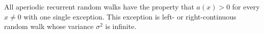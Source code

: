 All aperiodic recurrent random walks have the property that \(a(x) > 0\) for every \(x \neq 0\) with one single exception. This exception is left- or right-continuous random walk whose variance \(\sigma^2\) is infinite.
